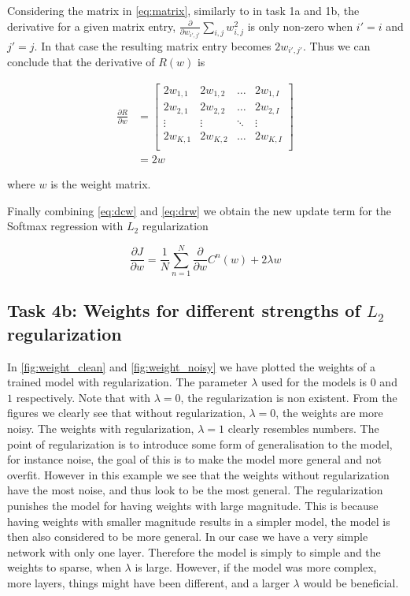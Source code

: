 \documentclass{article}
\begin{document}
Considering the matrix in \eqref{eq:matrix}, similarly to in task 1a and 1b, the derivative for a given matrix entry, $\frac{\partial}{\partial w_{i',j'}} \sum_{i,j}w_{i,j}^2$ is only non-zero when $i' = i$ and $j'=j$. In that case the resulting matrix entry becomes $2w_{i',j'}$. Thus we can conclude that the derivative of $R(w)$ is


\begin{align}
    \frac{\partial R}{\partial w} &= 
    \begin{bmatrix}
    2w_{1,1} & 2w_{1,2}  & \dots & 2w_{1,I} \\
    2w_{2,1} & 2w_{2,2}  & \dots & 2w_{2,I} \\
    \vdots & \vdots & \ddots & \vdots \\
    2w_{K,1} & 2w_{K,2}  & \dots & 2w_{K,I} \\
\end{bmatrix} \\
    &= 2w \label{eq:drw}
\end{align}

where $w$ is the weight matrix.

Finally combining \eqref{eq:dcw} and \eqref{eq:drw} we obtain the new update term for the Softmax regression with $L_2$ regularization

\begin{equation}
    \frac{\partial J}{\partial w} = \frac{1}{N} \sum_{n=1}^N \frac{\partial}{\partial w}C^n(w) + 2\lambda w
\end{equation}

\subsection{Task 4b: Weights for different strengths of $L_2$ regularization}


In \autoref{fig:weight_clean} and \autoref{fig:weight_noisy} we have plotted the weights of a trained model with regularization. The parameter $\lambda$ used for the models is $0$ and $1$ respectively. Note that with $\lambda = 0$, the regularization is non existent. From the figures we clearly see that without regularization, $\lambda = 0$, the weights are more noisy. The weights with regularization, $\lambda = 1$ clearly resembles numbers. The point of regularization is to introduce some form of generalisation to the model, for instance noise, the goal of this is to make the model more general and not overfit. However in this example we see that the weights without regularization have the most noise, and thus look to be the most general. The regularization punishes the model for having weights with large magnitude. This is because having weights with smaller magnitude results in a simpler model, the model is then also considered to be more general. In our case we have a very simple network with only one layer. Therefore the model is simply to simple and the weights to sparse, when $\lambda$ is large. However, if the model was more complex, more layers, things might have been different, and a larger $\lambda$ would be beneficial. 
\end{document}

